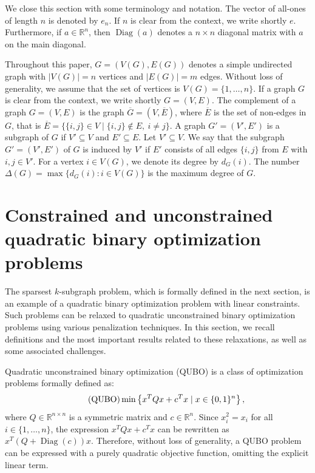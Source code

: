 \documentclass{article}
\DeclareMathOperator{\Diag}{Diag}
\begin{document}
  
We close this section with some terminology and notation. The vector of all-ones of length $n$ is denoted by $e_n$.
If $n$ is clear from the context, we write shortly $e$.
Furthermore, if $a \in \mathbb{R}^n$, then $\Diag(a)$ denotes a $n \times n$ diagonal matrix with $a$ on the main diagonal.

Throughout this paper, $G = (V(G), E(G))$ denotes a simple undirected graph with $\vert V(G) \vert = n$ vertices and $\vert E(G) \vert = m$ edges. Without loss of generality, we assume that the set of vertices is $V(G) = \{1, \ldots, n\}$. If a graph $G$ is clear from the context, we write shortly $G = (V, E)$. The complement of a graph $G = (V, E)$ is the graph $\overline{G} = (V, \overline{E})$, where $\overline{E}$ is the set of non-edges in $G$, that is $\overline{E} = \{ \{i, j\} \in V\; \vert \;  \{i,j\} \notin E, ~i \neq j\}$. A graph $G' = (V', E') $ is a subgraph of $G$ if $V' \subseteq V$ and $E' \subseteq E$. Let $V' \subseteq V$. We say that the subgraph $G' = ( V', E')$ of $G$ is induced by $V'$ if $E'$ consists of all edges $\{i,j\}$ from $E$  with $i,j \in V'$.  
For a vertex $i\in V(G)$, we denote its degree by $d_G(i)$. The number~$\Delta(G) = \max \{d_G(i) \colon i \in V(G) \}$ is the maximum degree of $G$.

\section{Constrained and unconstrained quadratic binary optimization problems}\label{QUBO_theory}


The sparsest $k$-subgraph problem, which is formally defined in the next section, is an example of a quadratic binary optimization problem with linear constraints. Such problems can be relaxed to quadratic unconstrained binary optimization problems using various penalization techniques.
In this section, we recall definitions and the most important results related to these relaxations, as well as some associated challenges.

Quadratic unconstrained binary optimization (QUBO) is a class of optimization problems formally defined as:
\begin{align}\label{general_QUBO}
\tag{\mbox{QUBO}}
\min \left \{x^T Q x + c^T x \mid x \in \{0, 1\}^n \right \},
\end{align}
where $Q \in \mathbb{R}^{n \times n}$ is a symmetric matrix and $c \in \mathbb{R}^n$. Since $x_i^2 = x_i$ for all $i \in \{1, \dots, n\}$, the expression $x^T Q x + c^T x$ can be rewritten as $x^T (Q + \Diag(c)) x$.
Therefore, without loss of generality, a QUBO problem can be expressed with a purely quadratic objective function, omitting the explicit linear term.
\end{document}
